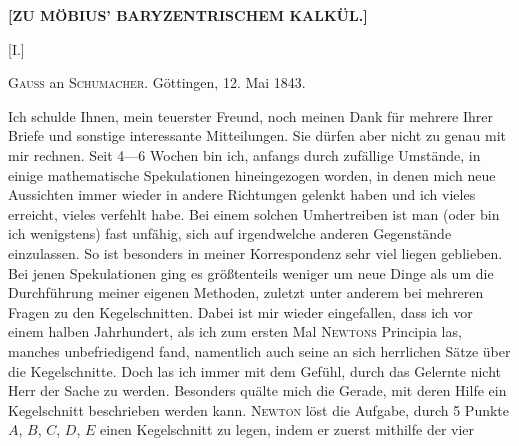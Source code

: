 \clearpage{}
\begin{center}
\textbf{[ZU MÖBIUS’ BARYZENTRISCHEM KALKÜL.]}

\medskip

[I.]
\end{center}

\begin{center}\textsc{Gauss} an \textsc{Schumacher}. Göttingen, 12. Mai 1843.\end{center}

Ich schulde Ihnen, mein teuerster Freund, noch meinen Dank für mehrere Ihrer Briefe und sonstige
interessante Mitteilungen. Sie dürfen aber nicht zu genau mit
mir rechnen. Seit 4---6 Wochen bin ich, anfangs durch zufällige Umstände, in einige
mathematische Spekulationen hineingezogen worden, in denen mich neue Aussichten immer wieder in
andere Richtungen gelenkt haben und ich vieles erreicht, vieles verfehlt habe. Bei einem
solchen Umhertreiben ist man (oder bin ich wenigstens) fast unfähig, sich auf irgendwelche
anderen Gegenstände einzulassen. So ist besonders in meiner Korrespondenz sehr viel liegen geblieben.
Bei jenen Spekulationen ging es größtenteils weniger um neue Dinge als um die Durchführung
meiner eigenen Methoden, zuletzt unter anderem bei mehreren Fragen zu den
Kegelschnitten. Dabei ist mir wieder eingefallen, dass ich vor einem halben
Jahrhundert, als ich zum ersten Mal \textsc{Newtons} Principia las, manches unbefriedigend
fand, namentlich auch seine an sich herrlichen Sätze über die Kegelschnitte.
Doch las ich immer mit dem Gefühl, durch das Gelernte nicht Herr der Sache
zu werden. Besonders quälte mich die Gerade, mit deren Hilfe ein Kegelschnitt
beschrieben werden kann. \textsc{Newton} löst die Aufgabe, durch 5 Punkte $A$, $B$,
$C$, $D$, $E$ einen Kegelschnitt zu legen, indem er zuerst mithilfe der vier

